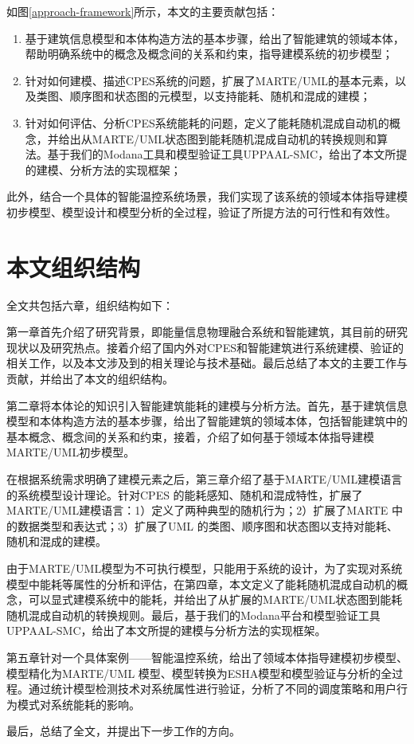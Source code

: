	如图\ref{approach-framework}所示，本文的主要贡献包括：	
	\begin{enumerate}
	\item 基于建筑信息模型和本体构造方法的基本步骤，给出了智能建筑的领域本体，帮助明确系统中的概念及概念间的关系和约束，指导建模系统的初步模型；
	\item 针对如何建模、描述CPES系统的问题，扩展了MARTE/UML的基本元素，以及类图、顺序图和状态图的元模型，以支持能耗、随机和混成的建模；
	\item 针对如何评估、分析CPES系统能耗的问题，定义了能耗随机混成自动机的概念，并给出从MARTE/UML状态图到能耗随机混成自动机的转换规则和算法。基于我们的Modana工具和模型验证工具UPPAAL-SMC，给出了本文所提的建模、分析方法的实现框架；
	\end{enumerate}
	
	此外，结合一个具体的智能温控系统场景，我们实现了该系统的领域本体指导建模初步模型、模型设计和模型分析的全过程，验证了所提方法的可行性和有效性。
\section{本文组织结构}
	全文共包括六章，组织结构如下：
	
	第一章首先介绍了研究背景，即能量信息物理融合系统和智能建筑，其目前的研究现状以及研究热点。接着介绍了国内外对CPES和智能建筑进行系统建模、验证的相关工作，以及本文涉及到的相关理论与技术基础。最后总结了本文的主要工作与贡献，并给出了本文的组织结构。
	
	第二章将本体论的知识引入智能建筑能耗的建模与分析方法。首先，基于建筑信息模型和本体构造方法的基本步骤，给出了智能建筑的领域本体，包括智能建筑中的基本概念、概念间的关系和约束，接着，介绍了如何基于领域本体指导建模MARTE/UML初步模型。
	
	在根据系统需求明确了建模元素之后，第三章介绍了基于MARTE/UML建模语言的系统模型设计理论。针对CPES 的能耗感知、随机和混成特性，扩展了MARTE/UML建模语言：1）定义了两种典型的随机行为；2）扩展了MARTE 中的数据类型和表达式；3）扩展了UML 的类图、顺序图和状态图以支持对能耗、随机和混成的建模。
	
	由于MARTE/UML模型为不可执行模型，只能用于系统的设计，为了实现对系统模型中能耗等属性的分析和评估，在第四章，本文定义了能耗随机混成自动机的概念，可以显式建模系统中的能耗，并给出了从扩展的MARTE/UML状态图到能耗随机混成自动机的转换规则。最后，基于我们的Modana平台和模型验证工具UPPAAL-SMC，给出了本文所提的建模与分析方法的实现框架。
	
	第五章针对一个具体案例——智能温控系统，给出了领域本体指导建模初步模型、模型精化为MARTE/UML 模型、模型转换为ESHA模型和模型验证与分析的全过程。通过统计模型检测技术对系统属性进行验证，分析了不同的调度策略和用户行为模式对系统能耗的影响。
	
	最后，总结了全文，并提出下一步工作的方向。